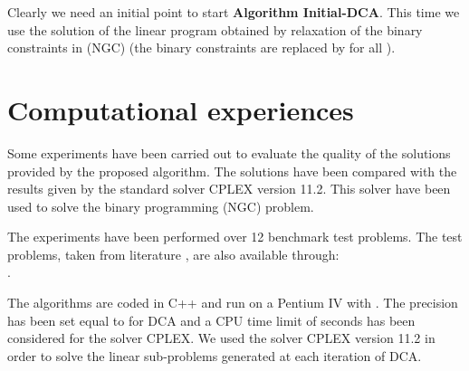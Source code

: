 \documentclass{iesmart}
\begin{document}
Clearly we need an initial point to start \textbf{Algorithm
Initial-DCA}. This time we use the solution of the linear program
obtained by relaxation of the binary constraints in (NGC) (the
binary constraints  are replaced by  for all ).

\section{Computational experiences}\label{sec:ComputExperim}

Some experiments have been carried out to evaluate the quality of
the solutions provided by the proposed algorithm. The solutions
have been compared with the results given by the standard solver
CPLEX version 11.2. This solver have been used to solve the binary
programming (NGC) problem.

The experiments have been performed over 12 benchmark test
problems. The test problems, taken from literature
\cite{Beasley1985,Beasley2004,Nepomuceno,Wang}, are also
available through:\\.

The algorithms are coded in C++ and run on
 a Pentium IV   with  . The precision  has been set equal to  for
DCA and a CPU time limit of  seconds has been considered for
the solver CPLEX. We used the solver CPLEX version 11.2 in order
to solve the linear sub-problems generated at each iteration of
DCA.
\end{document}
